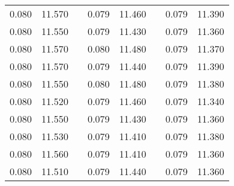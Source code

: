 \documentclass[12pt]{mwrep}
\begin{document}
\begin{table}[H]
\begin{tabularx}{\textwidth}{|Y|Y|p{2mm}|Y|Y|p{2mm}|Y|Y|}
			0.080 & 11.570 && 0.079 & 11.460 && 0.079 & 11.390 \\
			0.080 & 11.550 && 0.079 & 11.430 && 0.079 & 11.360 \\
			0.080 & 11.570 && 0.080 & 11.480 && 0.079 & 11.370 \\
			0.080 & 11.570 && 0.079 & 11.440 && 0.079 & 11.390 \\
			0.080 & 11.550 && 0.080 & 11.480 && 0.079 & 11.380 \\
			0.080 & 11.520 && 0.079 & 11.460 && 0.079 & 11.340 \\
			0.080 & 11.550 && 0.079 & 11.430 && 0.079 & 11.360 \\
			0.080 & 11.530 && 0.079 & 11.410 && 0.079 & 11.380 \\
			0.080 & 11.560 && 0.079 & 11.410 && 0.079 & 11.360 \\
			0.080 & 11.510 && 0.079 & 11.440 && 0.079 & 11.360 \\
		\end{tabularx}
	\end{table}
	
\end{document}
